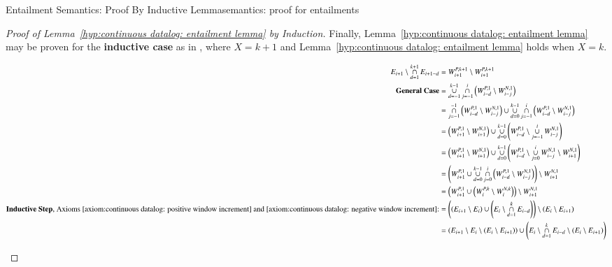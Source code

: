 \begin{nestedsection}{Entailment Semantics: Proof By Inductive Lemma}{semantics: proof for entailments}
\begin{proof}[Proof of Lemma~\ref{hyp:continuous datalog: entailment lemma} by Induction]
		Finally, Lemma~\ref{hyp:continuous datalog: entailment lemma} may be proven for the \textbf{inductive case} as in , where ${X = k + 1}$ and Lemma~\ref{hyp:continuous datalog: entailment lemma} holds when ${X = k}$.
		\begin{figure*}[p]
			\centering
			\caption[Proof of Entailment Lemma for Continuous Datalog]{Proof of Inductive Case of the Entailment Lemma for Continuous Datalog.}
			\begin{align*}
				E_{i+1} \setminus \mathop{\cap}^{k+1}_{d=1} E_{i+1-d} & = W^{P,k+1}_{i+1} \setminus W^{P,k+1}_{i+1} \\
				\text{\textbf{General Case}} & = \mathop{\cup}^{k-1}_{d=-1}\mathop{\cap}^{i}_{j=-1} \left( W^{P,1}_{i-d} \setminus W^{N,1}_{i-j} \right) \\
				& = \mathop{\cap}^{-1}_{j=-1} \left( W^{P,1}_{i-d} \setminus W^{N,1}_{i-j} \right) \cup \mathop{\cup}^{k-1}_{d=0}\mathop{\cap}^{i}_{j=-1} \left( W^{P,1}_{i-d} \setminus W^{N,1}_{i-j} \right) \\
				& = \left( W^{P,1}_{i+1} \setminus W^{N,1}_{i+1} \right) \cup \mathop{\cup}^{k-1}_{d=0} \left( W^{P,1}_{i-d} \setminus \mathop{\cup}^{i}_{j=-1} W^{N,1}_{i-j} \right) \\
				& = \left( W^{P,1}_{i+1} \setminus W^{N,1}_{i+1} \right) \cup \mathop{\cup}^{k-1}_{d=0} \left( W^{P,1}_{i-d} \setminus \mathop{\cup}^{i}_{j=0} W^{N,1}_{i-j} \setminus W^{N,1}_{i+1} \right) \\
				& = \left( W^{P,1}_{i+1} \cup \mathop{\cup}^{k-1}_{d=0}\mathop{\cap}^{i}_{j=0} \left( W^{P,1}_{i-d} \setminus W^{N,1}_{i-j} \right) \right) \setminus W^{N,1}_{i+1} \\
				& = \left( W^{P,1}_{i+1} \cup \left( W^{P,k}_{i} \setminus W^{N,k}_{i} \right) \right) \setminus W^{N,1}_{i+1} \\
				\text{\textbf{Inductive Step}, Axioms~\ref{axiom:continuous datalog: positive window increment}~and~\ref{axiom:continuous datalog: negative window increment}:}& = \left( \left( E_{i+1} \setminus E_{i} \right) \cup \left( E_{i} \setminus \mathop{\cap}^{k}_{d=1} E_{i-d} \right) \right) \setminus \left( E_{i} \setminus E_{i+1} \right) \\
				& = \left( E_{i+1} \setminus E_{i} \setminus \left( E_{i} \setminus E_{i+1} \right) \right) \cup \left( E_{i} \setminus \mathop{\cap}^{k}_{d=1} E_{i-d} \setminus \left( E_{i} \setminus E_{i+1} \right) \right) \\

\end{align*}
\end{figure*}
\end{proof}
\end{nestedsection}
